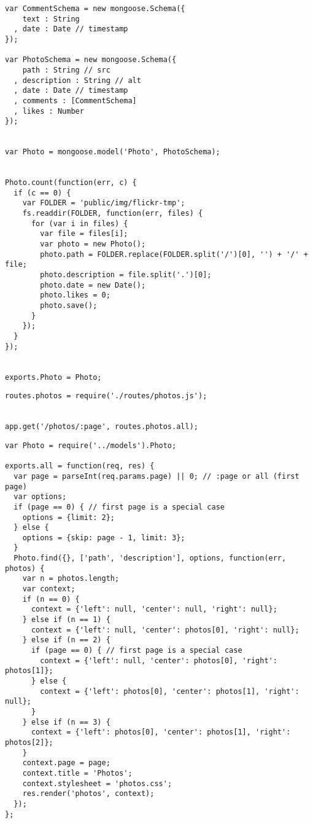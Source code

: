 \documentclass{article}
\begin{document}
\begin{verbatim}
var CommentSchema = new mongoose.Schema({
    text : String
  , date : Date // timestamp
});

var PhotoSchema = new mongoose.Schema({
    path : String // src
  , description : String // alt
  , date : Date // timestamp
  , comments : [CommentSchema]
  , likes : Number
});


var Photo = mongoose.model('Photo', PhotoSchema);


Photo.count(function(err, c) {
  if (c == 0) {
    var FOLDER = 'public/img/flickr-tmp';
    fs.readdir(FOLDER, function(err, files) {
      for (var i in files) {
        var file = files[i];
        var photo = new Photo();
        photo.path = FOLDER.replace(FOLDER.split('/')[0], '') + '/' + file;
        photo.description = file.split('.')[0];
        photo.date = new Date();
        photo.likes = 0;
        photo.save();
      }
    });
  }
});


exports.Photo = Photo;
\end{verbatim}


\begin{verbatim}
routes.photos = require('./routes/photos.js');


app.get('/photos/:page', routes.photos.all);
\end{verbatim}


\begin{verbatim}
var Photo = require('../models').Photo;

exports.all = function(req, res) {
  var page = parseInt(req.params.page) || 0; // :page or all (first page)
  var options;
  if (page == 0) { // first page is a special case
    options = {limit: 2};
  } else {
    options = {skip: page - 1, limit: 3};
  }
  Photo.find({}, ['path', 'description'], options, function(err, photos) {
    var n = photos.length;
    var context;
    if (n == 0) {
      context = {'left': null, 'center': null, 'right': null};
    } else if (n == 1) {
      context = {'left': null, 'center': photos[0], 'right': null};
    } else if (n == 2) {
      if (page == 0) { // first page is a special case
        context = {'left': null, 'center': photos[0], 'right': photos[1]};
      } else {
        context = {'left': photos[0], 'center': photos[1], 'right': null};
      }
    } else if (n == 3) {
      context = {'left': photos[0], 'center': photos[1], 'right': photos[2]};
    }
    context.page = page;
    context.title = 'Photos';
    context.stylesheet = 'photos.css';
    res.render('photos', context);
  });
};
\end{verbatim}
\end{document}
